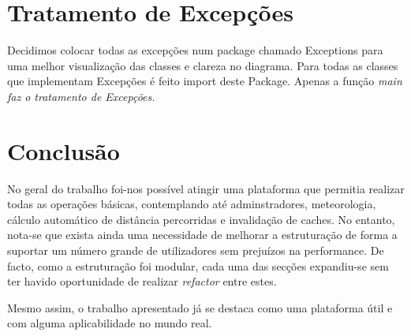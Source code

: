 \documentclass{article}
\begin{document}
\pagebreak
\section{Tratamento de Excepções}
\quad Decidimos colocar todas as excepções num package chamado Exceptions para uma melhor visualização das classes e
clareza no diagrama. Para todas as classes que implementam Excepções é feito import deste Package. Apenas a função
\em main faz o tratamento de Excepções.
\pagebreak
\section{Conclusão}
No geral do trabalho foi-nos possível atingir uma plataforma que permitia realizar todas as operações básicas, contemplando até adminstradores, meteorologia, cálculo automático de distância percorridas e invalidação de caches. No entanto, nota-se que exista ainda uma necessidade de melhorar a estruturação de forma a suportar um número grande de utilizadores sem prejuízos na performance. De facto, como a estruturação foi modular, cada uma das secções expandiu-se sem ter havido oportunidade de realizar \emph{refactor} entre estes.

Mesmo assim, o trabalho apresentado já se destaca como uma plataforma útil e com alguma aplicabilidade no mundo real.
\end{document}
